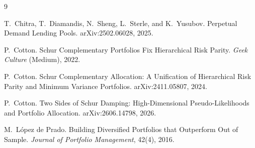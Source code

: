 \documentclass[11pt]{article}
\theoremstyle{definition}
\begin{document}
\begin{thebibliography}{9}

T.~Chitra, T.~Diamandis, N.~Sheng, L.~Sterle, and K.~Yusubov.
\newblock Perpetual Demand Lending Pools.
\newblock arXiv:2502.06028, 2025.

P.~Cotton.
\newblock Schur Complementary Portfolios Fix Hierarchical Risk Parity.
\newblock \emph{Geek Culture} (Medium), 2022.

P.~Cotton.
\newblock Schur Complementary Allocation: A Unification of Hierarchical Risk
Parity and Minimum Variance Portfolios.
\newblock arXiv:2411.05807, 2024.

P.~Cotton.
\newblock Two Sides of Schur Damping: High-Dimensional Pseudo-Likelihoods and
Portfolio Allocation.
\newblock arXiv:2606.14798, 2026.

M.~L\'opez de Prado.
\newblock Building Diversified Portfolios that Outperform Out of Sample.
\newblock \emph{Journal of Portfolio Management}, 42(4), 2016.

\end{thebibliography}
\end{document}
